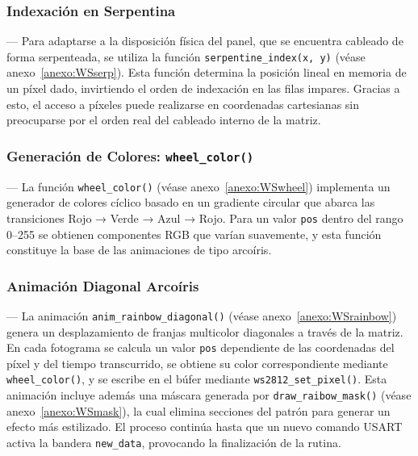 \vspace{1em}

\subsubsection{Indexación en Serpentina} ---
Para adaptarse a la disposición física del panel, que se encuentra cableado de forma serpenteada, se utiliza la función \texttt{serpentine\_index(x, y)} (véase anexo~\ref{anexo:WSserp}). Esta función determina la posición lineal en memoria de un píxel dado, invirtiendo el orden de indexación en las filas impares. Gracias a esto, el acceso a píxeles puede realizarse en coordenadas cartesianas sin preocuparse por el orden real del cableado interno de la matriz.

\vspace{1em}

\subsubsection{Generación de Colores: \texttt{wheel\_color()}} ---
La función \texttt{wheel\_color()} (véase anexo~\ref{anexo:WSwheel}) implementa un generador de colores cíclico basado en un gradiente circular que abarca las transiciones Rojo → Verde → Azul → Rojo. Para un valor \texttt{pos} dentro del rango 0–255 se obtienen componentes RGB que varían suavemente, y esta función constituye la base de las animaciones de tipo arcoíris.

\vspace{1em}

\subsubsection{Animación Diagonal Arcoíris} ---
La animación \texttt{anim\_rainbow\_diagonal()} (véase anexo~\ref{anexo:WSrainbow}) genera un desplazamiento de franjas multicolor diagonales a través de la matriz. En cada fotograma se calcula un valor \texttt{pos} dependiente de las coordenadas del píxel y del tiempo transcurrido, se obtiene su color correspondiente mediante \texttt{wheel\_color()}, y se escribe en el búfer mediante \texttt{ws2812\_set\_pixel()}. Esta animación incluye además una máscara generada por \texttt{draw\_raibow\_mask()} (véase anexo~\ref{anexo:WSmask}), la cual elimina secciones del patrón para generar un efecto más estilizado. El proceso continúa hasta que un nuevo comando USART activa la bandera \texttt{new\_data}, provocando la finalización de la rutina.

